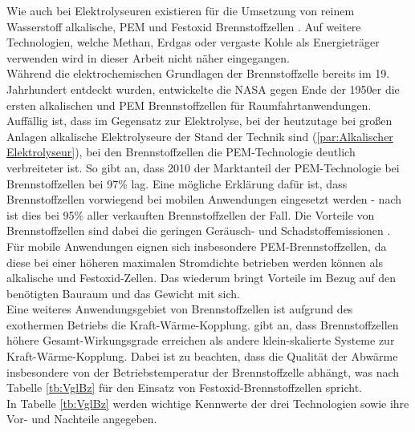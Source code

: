 Wie auch bei Elektrolyseuren existieren für die Umsetzung von reinem Wasserstoff alkalische, PEM und Festoxid Brennstoffzellen \citep{lucia_overview_2014}. Auf weitere Technologien, welche Methan, Erdgas oder vergaste Kohle als Energieträger verwenden wird in dieser Arbeit nicht näher eingegangen.\\
Während die elektrochemischen Grundlagen der Brennstoffzelle bereits im 19. Jahrhundert entdeckt wurden, entwickelte die NASA   gegen Ende der 1950er die ersten alkalischen und PEM Brennstoffzellen für Raumfahrtanwendungen. Auffällig ist, dass im Gegensatz zur Elektrolyse, bei der heutzutage bei großen Anlagen alkalische Elektrolyseure der Stand der Technik sind (\ref{par:Alkalischer Elektrolyseur}), bei den Brennstoffzellen die PEM-Technologie deutlich verbreiteter ist. So gibt \citet{lucia_overview_2014} an, dass 2010  der Marktanteil der PEM-Technologie bei Brennstoffzellen bei 97\% lag. Eine mögliche Erklärung dafür ist, dass Brennstoffzellen vorwiegend bei mobilen Anwendungen eingesetzt werden - nach \citet{lucia_overview_2014} ist dies bei 95\% aller verkauften Brennstoffzellen der Fall. Die Vorteile von Brennstoffzellen sind dabei die geringen Geräusch- und Schadstoffemissionen \citep{olabi_prospects_2020}. Für mobile Anwendungen eignen sich insbesondere PEM-Brennstoffzellen, da diese bei einer höheren maximalen Stromdichte betrieben werden können als alkalische und Festoxid-Zellen. Das wiederum bringt  Vorteile im Bezug auf den benötigten Bauraum und das Gewicht mit sich.\\ 
Eine weiteres Anwendungsgebiet von Brennstoffzellen ist aufgrund des exothermen Betriebs die Kraft-Wärme-Kopplung. \citet{olabi_prospects_2020} gibt an, dass Brennstoffzellen höhere Gesamt-Wirkungsgrade erreichen als andere klein-skalierte Systeme zur Kraft-Wärme-Kopplung. Dabei ist zu beachten, dass die Qualität der Abwärme insbesondere von der Betriebstemperatur der Brennstoffzelle abhängt, was nach Tabelle \ref{tb:VglBz} für den Einsatz von Festoxid-Brennstoffzellen spricht.\\ 
In Tabelle \ref{tb:VglBz} werden wichtige Kennwerte der drei Technologien sowie ihre Vor- und Nachteile angegeben.\\

